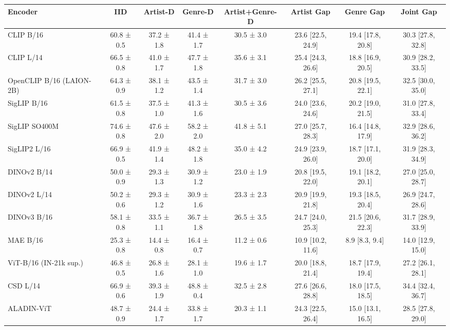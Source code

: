 \begin{tabular}{lccccccc}
\toprule
Encoder & IID & Artist-D & Genre-D & Artist+Genre-D & Artist Gap & Genre Gap & Joint Gap \\
\midrule
CLIP B/16 & 60.8 ± 0.5 & 37.2 ± 1.8 & 41.4 ± 1.7 & 30.5 ± 3.0 & 23.6 [22.5, 24.9] & 19.4 [17.8, 20.8] & 30.3 [27.8, 32.8] \\
CLIP L/14 & 66.5 ± 0.8 & 41.0 ± 1.7 & 47.7 ± 1.8 & 35.6 ± 3.1 & 25.4 [24.3, 26.6] & 18.8 [16.9, 20.5] & 30.9 [28.2, 33.5] \\
OpenCLIP B/16 (LAION-2B) & 64.3 ± 0.9 & 38.1 ± 1.2 & 43.5 ± 1.4 & 31.7 ± 3.0 & 26.2 [25.5, 27.1] & 20.8 [19.5, 22.1] & 32.5 [30.0, 35.0] \\
SigLIP B/16 & 61.5 ± 0.8 & 37.5 ± 1.0 & 41.3 ± 1.6 & 30.5 ± 3.6 & 24.0 [23.6, 24.6] & 20.2 [19.0, 21.5] & 31.0 [27.8, 33.4] \\
SigLIP SO400M & 74.6 ± 0.8 & 47.6 ± 2.0 & 58.2 ± 2.0 & 41.8 ± 5.1 & 27.0 [25.7, 28.3] & 16.4 [14.8, 17.9] & 32.9 [28.6, 36.2] \\
SigLIP2 L/16 & 66.9 ± 0.5 & 41.9 ± 1.4 & 48.2 ± 1.8 & 35.0 ± 4.2 & 24.9 [23.9, 26.0] & 18.7 [17.1, 20.0] & 31.9 [28.3, 34.9] \\
DINOv2 B/14 & 50.0 ± 0.9 & 29.3 ± 1.3 & 30.9 ± 1.2 & 23.0 ± 1.9 & 20.8 [19.5, 22.0] & 19.1 [18.2, 20.1] & 27.0 [25.0, 28.7] \\
DINOv2 L/14 & 50.2 ± 0.6 & 29.3 ± 1.2 & 30.9 ± 1.6 & 23.3 ± 2.3 & 20.9 [19.9, 21.8] & 19.3 [18.5, 20.4] & 26.9 [24.7, 28.6] \\
DINOv3 B/16 & 58.1 ± 0.8 & 33.5 ± 1.1 & 36.7 ± 1.8 & 26.5 ± 3.5 & 24.7 [24.0, 25.3] & 21.5 [20.6, 22.3] & 31.7 [28.9, 33.9] \\
MAE B/16 & 25.3 ± 0.8 & 14.4 ± 0.8 & 16.4 ± 0.7 & 11.2 ± 0.6 & 10.9 [10.2, 11.6] & 8.9 [8.3, 9.4] & 14.0 [12.9, 15.0] \\
ViT-B/16 (IN-21k sup.) & 46.8 ± 0.5 & 26.8 ± 1.6 & 28.1 ± 1.0 & 19.6 ± 1.7 & 20.0 [18.8, 21.4] & 18.7 [17.9, 19.4] & 27.2 [26.1, 28.1] \\
CSD L/14 & 66.9 ± 0.6 & 39.3 ± 1.9 & 48.8 ± 0.4 & 32.5 ± 2.8 & 27.6 [26.6, 28.8] & 18.0 [17.5, 18.5] & 34.4 [32.4, 36.7] \\
ALADIN-ViT & 48.7 ± 0.9 & 24.4 ± 1.7 & 33.8 ± 1.7 & 20.3 ± 1.1 & 24.3 [22.5, 26.4] & 15.0 [13.1, 16.5] & 28.5 [27.8, 29.0] \\
\bottomrule
\end{tabular}
